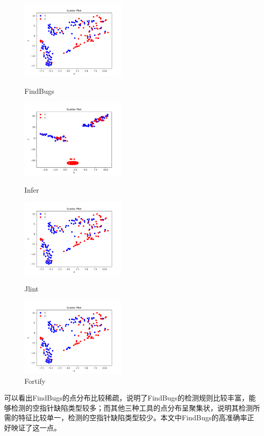 \begin{figure}[h]
\label{f1}
	\parbox[h]{.5\textwidth}{\centering
		\includegraphics[width=0.45\textwidth]{figures/11.png}
		\caption{FindBugs}}
	\parbox[h]{.5\textwidth}{\centering
		\includegraphics[width=0.45\textwidth]{figures/12.pdf}
		\caption{Infer}}
	\parbox[h]{.5\textwidth}{\centering
		\includegraphics[width=0.45\textwidth]{figures/11.png}
		\caption{Jlint}}
	\parbox[h]{.5\textwidth}{\centering
		\includegraphics[width=0.45\textwidth]{figures/11.png}
		\caption{Fortify}}
\end{figure}

可以看出FindBugs的点分布比较稀疏，说明了FindBugs的检测规则比较丰富，能够检测的空指针缺陷类型较多；而其他三种工具的点分布呈聚集状，说明其检测所需的特征比较单一，检测的空指针缺陷类型较少。本文中FindBugs的高准确率正好映证了这一点。

